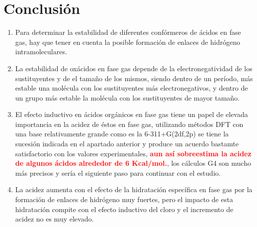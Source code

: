 \chapter{Conclusión}

\begin{enumerate}
	\item Para determinar la estabilidad de diferentes confórmeros de ácidos en fase gas, hay que tener en cuenta la posible formación de enlaces de hidrógeno intramoleculares.
	\item La estabilidad de oxácidos en fase gas depende de la electronegatividad de los sustituyentes y de el tamaño de los mismos, siendo dentro de un período, más estable una molécula con los sustituyentes más electronegativos, y dentro de un grupo más estable la molécula con los sustituyentes de mayor tamaño.
	\item El efecto inductivo en ácidos orgánicos en fase gas tiene un papel de elevada importancia en la acidez de éstos en fase gas, utilizando métodos DFT con una base relativamente grande como es la 6-311+G(2df,2p) se tiene la sucesión indicada en el apartado anterior y produce un acuerdo bastamte satisfactorio con los valores experimentales,  {\bfseries\textcolor{red} {aun así sobreestima la acidez de algunos ácidos alrededor de 6 Kcal/mol.}}, los cálculos G4 son mucho más precisos y sería el siguiente paso para continuar con el estudio.
	\item La acidez aumenta con el efecto de la hidratación específica en fase gas por la formación de enlaces de hidrógeno muy fuertes, pero el impacto de esta hidratación compite con el efecto inductivo del cloro y el incremento de acidez no es muy elevado.
	
	
\end{enumerate}